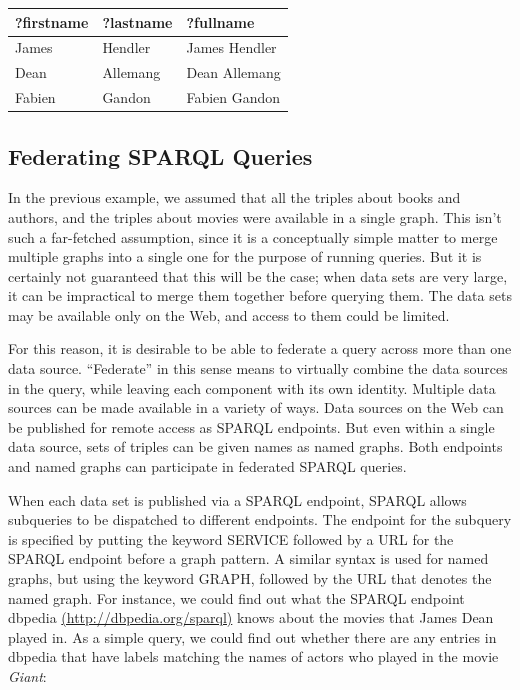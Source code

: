 \begin{tabular}{|lll|}
\hline
?firstname&?lastname&?fullname\\
\hline
James&Hendler&James Hendler\\
Dean&Allemang&Dean Allemang\\
Fabien&Gandon&Fabien Gandon\\
\hline
\end{tabular}



\subsection{Federating SPARQL Queries}

In the previous example, we assumed that all the triples about books and
authors, and the triples about movies were available in a single graph.
This isn't such a far-fetched assumption, since it is a conceptually
simple matter to merge multiple graphs into a single one for the purpose
of running queries. But it is certainly not guaranteed that this will be
the case; when data sets are very large, it can be impractical to merge
them together before querying them. The data sets may be available only
on the Web, and access to them could be limited.

For this reason, it is desirable to be able to federate a query across
more than one data source. ``Federate'' in this sense means to virtually
combine the data sources in the query, while leaving each component with
its own identity. Multiple data sources can be made available in a
variety of ways. Data sources on the Web can be published for remote
access as SPARQL endpoints. But even within a single data source, sets
of triples can be given names as named graphs. Both endpoints and named
graphs can participate in federated SPARQL queries.

When each data set is published via a SPARQL endpoint, SPARQL allows
subqueries to be dispatched to different endpoints. The endpoint for the subquery is
specified by putting the keyword SERVICE followed by a URL for the
SPARQL endpoint before a graph pattern. A similar syntax is used for
named graphs, but using the keyword GRAPH, followed by the URL that
denotes the named graph. For instance, we could find out what the SPARQL
endpoint dbpedia
\href{http://dbpedia.org/sparql)}{(http://dbpedia.org/sparql)} knows
about the movies that James Dean played in. As a simple query, we could
find out whether there are any entries in dbpedia that have labels
matching the names of actors who played in the movie \emph{Giant}:

